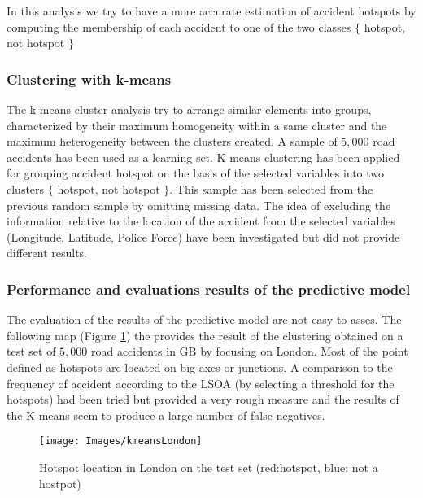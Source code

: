 \documentclass{article}
\begin{document}
In this analysis we try to have a more accurate estimation of accident hotspots by computing the membership of each accident to one of the two classes $\{$ hotspot, not hotspot $\} $




\subsubsection{Clustering with k-means}

The k-means cluster analysis try to arrange similar elements into groups, characterized by their maximum homogeneity within
a same cluster and the maximum heterogeneity between the clusters created.
A sample of $5,000$ road accidents has been used as a learning set. K-means clustering has been applied for grouping accident hotspot on the basis of the selected variables into two clusters $\{$ hotspot, not hotspot $\}$. This sample has been selected from the previous random sample by omitting missing data.
The idea of excluding the information relative to the location of the accident from the selected variables (Longitude, Latitude, Police Force) have been investigated but did not provide different results.



\subsubsection{Performance and evaluations results of the predictive model}

The evaluation of the results of the predictive model are not easy to asses. The following map (Figure \ref{fig:kmeansLondon}) the provides the result of the clustering obtained on a test set of $5,000$ road accidents in GB by focusing on London. Most of the point defined as hotspots are located on big axes or junctions. A comparison to the frequency of accident according to the LSOA (by selecting a threshold for the hotspots) had been tried but provided a very rough measure and the results of the K-means seem to produce a large number of false negatives. 

\begin{figure}[H]
  \centering
  \texttt{[image: Images/kmeansLondon]}
  \caption{Hotspot location in London on the test set (red:hotspot, blue: not a hostpot)  }
  \label{fig:kmeansLondon}
\end{figure} 
\end{document}
